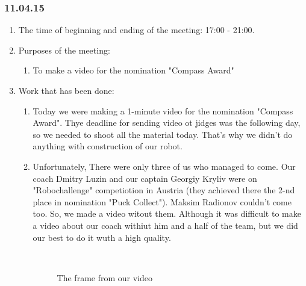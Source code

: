 \subsubsection{11.04.15}
\begin{enumerate}
	
	\item The time of beginning and ending of the meeting: 17:00 - 21:00.
	
	\item Purposes of the meeting: 
	\begin{enumerate}
		
		\item To make a video for the nomination "Compass Award"
		
	\end{enumerate}

	\item Work that has been done:
	\begin{enumerate}
		
		\item Today we were making a 1-minute video for the nomination "Compass Award". Thye deadline for sending video ot jidges was the following day, so we needed to shoot all the material today. That's why we didn't do anything with construction of our robot.
		
		\item Unfortunately, There were only three of us who managed to come. Our coach Dmitry Luzin and our captain Georgiy Kryliv were on "Robochallenge" competiotion in Austria (they achieved there the 2-nd place in nomination "Puck Collect"). Maksim Radionov couldn't come too. So, we made a video witout them. Although it was difficult to make a video about our coach withiut him and a half of the team, but we did our best to do it wuth a high quality.
        \begin{figure}[H]
        	\begin{minipage}[h]{0.2\linewidth}
        		\center  
        	\end{minipage}
        	\begin{minipage}[h]{0.6\linewidth}
        		\caption{The frame from our video}
        	\end{minipage}
        \end{figure}


\end{enumerate}
\end{enumerate}
